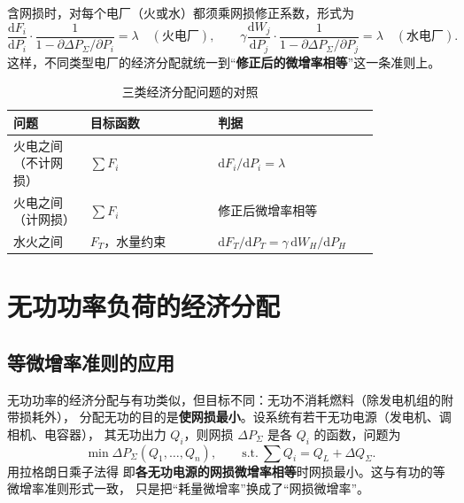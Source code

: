 含网损时，对每个电厂（火或水）都须乘网损修正系数，形式为
\begin{equation}
  \frac{\mathrm{d}F_i}{\mathrm{d}P_i}\cdot\frac{1}{1-\partial\Delta P_{\Sigma}/\partial P_i}
  =\lambda\quad(\text{火电厂}),\qquad
  \gamma\frac{\mathrm{d}W_j}{\mathrm{d}P_j}\cdot\frac{1}{1-\partial\Delta P_{\Sigma}/\partial P_j}
  =\lambda\quad(\text{水电厂}).
\end{equation}
这样，不同类型电厂的经济分配就统一到“\textbf{修正后的微增率相等}”这一条准则上。

\begin{table}[htbp]
  \centering
  \caption{三类经济分配问题的对照}
  \small
  \begin{tabular}{@{}p{0.18\linewidth}p{0.30\linewidth}p{0.34\linewidth}@{}}
    \toprule
    问题 & 目标函数 & 判据 \\
    \midrule
    火电之间（不计网损） & $\sum F_i$ & $\mathrm{d}F_i/\mathrm{d}P_i=\lambda$ \\
    火电之间（计网损） & $\sum F_i$ & 修正后微增率相等 \\
    水火之间 & $F_T$，水量约束 & $\mathrm{d}F_T/\mathrm{d}P_T=\gamma\,\mathrm{d}W_H/\mathrm{d}P_H$ \\
    \bottomrule
  \end{tabular}
\end{table}


\section{无功功率负荷的经济分配}

\subsection{等微增率准则的应用}

无功功率的经济分配与有功类似，但目标不同：无功不消耗燃料（除发电机组的附带损耗外），
分配无功的目的是\textbf{使网损最小}。设系统有若干无功电源（发电机、调相机、电容器），
其无功出力 $Q_i$，则网损 $\Delta P_{\Sigma}$ 是各 $Q_i$ 的函数，问题为
\begin{equation}
  \min\Delta P_{\Sigma}\left(Q_1,\dots,Q_n\right),
  \qquad \text{s.t.}\ \sum Q_i=Q_L+\Delta Q_{\Sigma}.
\end{equation}
用拉格朗日乘子法得
即\textbf{各无功电源的网损微增率相等}时网损最小。这与有功的等微增率准则形式一致，
只是把“耗量微增率”换成了“网损微增率”。

